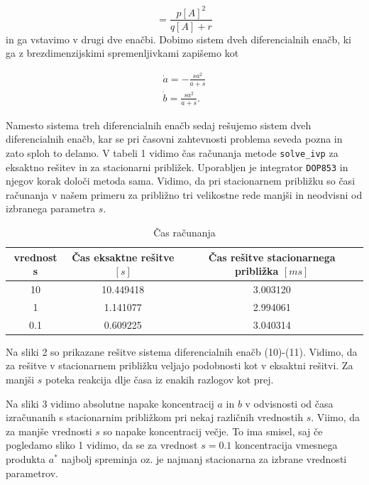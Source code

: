 \documentclass[slovene,11pt,a4paper]{article}
\begin{document}
\begin{equation}
[A^*] = \frac{p[A]^2}{q[A]+r}
\end{equation}
in ga vstavimo v drugi dve enačbi. Dobimo sistem dveh diferencialnih enačb, ki ga z brezdimenzijskimi spremenljivkami zapišemo kot

\begin{align}
\dot{a} = -\frac{sa^2}{a+s} \\
\dot{b} = \frac{sa^2}{a+s}.
\end{align}

Namesto sistema treh diferencialnih enačb sedaj rešujemo sistem dveh diferencialnih enačb, kar se pri časovni zahtevnosti problema seveda pozna in zato sploh to delamo. V tabeli 1 vidimo čas računanja metode \texttt{solve\_ivp} za eksaktno rešitev in za stacionarni približek. Uporabljen je integrator \texttt{DOP853} in njegov korak določi metoda sama. Vidimo, da pri stacionarnem približku so časi računanja v našem primeru za približno tri velikostne rede manjši in neodvisni od izbranega parametra $s$.
\begin{table}[h!]
\centering
\begin{tabular}{ccc}
\toprule
vrednost s &  Čas eksaktne rešitve $[s]$ &  Čas rešitve stacionarnega približka $[ms]$ \\
\midrule
10  &         10.449418 &               3.003120 \\
1   &          1.141077 &               2.994061 \\
0.1 &          0.609225 &               3.040314 \\
\bottomrule
\end{tabular}
\caption{Čas računanja}
\end{table}

Na sliki 2 so prikazane rešitve sistema diferencialnih enačb (10)-(11). Vidimo, da za rešitve v stacionarnem približku veljajo podobnosti kot v eksaktni rešitvi. Za manjši $s$ poteka reakcija dlje časa iz enakih razlogov kot prej.

Na sliki 3 vidimo absolutne napake koncentracij $a$ in $b$ v odvisnosti od časa izračunanih s stacionarnim približkom pri nekaj različnih vrednostih $s$. Viimo, da za manjše vrednosti $s$ so napake koncentracij večje. To ima smisel, saj če pogledamo sliko 1 vidimo, da se za vrednost $s=0.1$ koncentracija vmesnega produkta $a^*$ najbolj spreminja oz. je najmanj stacionarna za izbrane vrednosti parametrov.

\newpage
\end{document}
